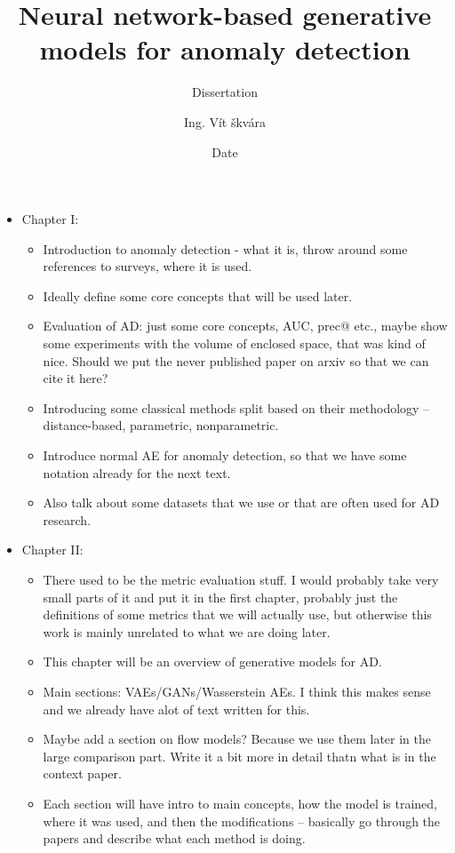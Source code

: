 \documentclass[twoside, a4paper, 12pt]{book}
\title{Neural network-based generative models for anomaly detection}
\subtitle{Dissertation}
\author{Ing. Vít škvára}
\date{Date}
\begin{document}
\maketitle


\begin{itemize}
	\item Chapter I: 
		\begin{itemize}
			\item Introduction to anomaly detection - what it is, throw around some references to surveys, where it is used.
			\item Ideally define some core concepts that will be used later.
			\item Evaluation of AD: just some core concepts, AUC, prec@ etc., maybe show some experiments with the volume of enclosed space, that was kind of nice. Should we put the never published paper on arxiv so that we can cite it here?
			\item Introducing some classical methods split based on their methodology -- distance-based, parametric, nonparametric.
			\item Introduce normal AE for anomaly detection, so that we have some notation already for the next text.
			\item Also talk about some datasets that we use or that are often used for AD research.
		\end{itemize}
	\item Chapter II:
	\begin{itemize}
			\item There used to be the metric evaluation stuff. I would probably take very small parts of it and put it in the first chapter, probably just the definitions of some metrics that we will actually use, but otherwise this work is mainly unrelated to what we are doing later.
			\item This chapter will be an overview of generative models for AD.
			\item Main sections: VAEs/GANs/Wasserstein AEs. I think this makes sense and we already have alot of text written for this.
			\item Maybe add a section on flow models? Because we use them later in the large comparison part. Write it a bit more in detail thatn what is in the context paper.
			\item Each section will have intro to main concepts, how the model is trained, where it was used, and then the modifications -- basically go through the papers and describe what each method is doing.
		\end{itemize}

\end{itemize}
\end{document}
